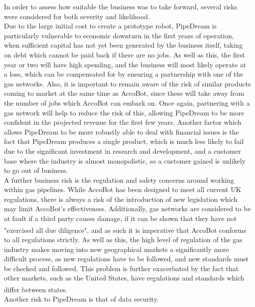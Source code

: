 \documentclass[11pt]{article}		%
\newcommand{\supercite}[1]{\textsuperscript{\cite{#1}}}		%
\begin{document}
     	In order to assess how suitable the business was to take forward, several risks were considered for both severity and likelihood. %
     	\\
     	Due to the large initial cost to create a prototype robot, PipeDream is particularly vulnerable to economic downturn in the first years of operation, when sufficient capital has not yet been generated by the business itself, taking on debt which cannot be paid back if there are no jobs.
     	As well as this, the first year or two will have high spending, and the business will most likely operate at a loss, which can be compensated for by ensuring a partnership with one of the gas networks.
     	Also, it is important to remain aware of the risk of similar products coming to market at the same time as AccoBot, since these will take away from the number of jobs which AccoBot can embark on.
     	Once again, partnering with a gas network will help to reduce the risk of this, allowing PipeDream to be more confident in the projected revenue for the first few years.
     	Another factor which allows PipeDream to be more robustly able to deal with financial issues is the fact that PipeDream produces a single product, which is much less likely to fail due to the significant investment in research and development, and a customer base where the industry is almost monopolistic, so a customer gained is unlikely to go out of business.
     	\\
     	A further business risk is the regulation and safety concerns around working within gas pipelines.
     	While AccoBot has been designed to meet all current UK regulations, there  is always a risk of the introduction of new legislation which may limit AccoBot's effectiveness.
     	Additionally, gas networks are considered to be at fault if a third party causes damage, if it can be shown that they have not "exercised all due diligence"\supercite{hse1996guide}, and as such it is imperative that AccoBot conforms to all regulations strictly.
     	As well as this, the high level of regulation of the gas industry makes moving into new geographical markets a significantly more difficult process, as new regulations have to be followed, and new standards must be checked and followed.
     	This problem is further exacerbated by the fact that other markets, such as the United States, have regulations and standards which differ between states\supercite{pless2011making}.
     	\\
     	Another risk to PipeDream is that of data security.
\end{document}
